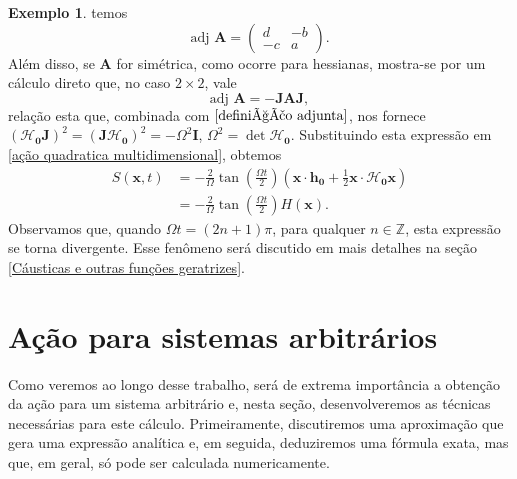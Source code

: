 \documentclass[
	12pt,
	oneside,			%
	a4paper,			%
	english,			%
	brazil				%
	]{abntex2}
\theoremstyle{definition}
\newtheorem{exmp}{Exemplo}[chapter]
\begin{document}
\begin{exmp}
    temos
    \begin{equation}
        \text{adj } \mathbf{A} = \begin{pmatrix}
        d & -b \\
        -c & a
        \end{pmatrix}.
    \end{equation}
    Além disso, se $\mathbf{A}$ for simétrica, como ocorre para hessianas, mostra-se por um cálculo direto que, no caso $2 \times 2$, vale
    \begin{equation}
        \text{adj } \mathbf{A} = -\mathbf{J} \mathbf{A} \mathbf{J},
    \end{equation}
    relação esta que, combinada com $\eqref{definição adjunta}$, nos fornece $\left(\boldsymbol{\mathcal{H}}_\mathbf{0} \mathbf{J}\right)^2 = \left(\mathbf{J}\boldsymbol{\mathcal{H}}_\mathbf{0} \right)^2 = -\Omega^2 \mathbf{I}$, $\Omega^2 = \det \boldsymbol{\mathcal{H}}_\mathbf{0}$. Substituindo esta expressão em \eqref{ação quadratica multidimensional}, obtemos
    \begin{equation}
    \label{ação_quadŕatica}
        \begin{aligned}
            S(\mathbf{x},t) &= -\frac{2}{\Omega}\tan \left(\frac{\Omega t}{2}\right) \left(  \mathbf{x} \cdot \mathbf{h_0} +  \frac{1}{2}\mathbf{x} \cdot \boldsymbol{\mathcal{H}_{\mathbf{0}}} \mathbf{x}\right) \\
            &= -\frac{2}{\Omega}\tan \left(\frac{\Omega t}{2}\right) H(\mathbf{x}).
        \end{aligned}
    \end{equation}
    Observamos que, quando $\Omega t = (2n+1) \pi$, para qualquer $n \in \mathbb{Z}$, esta expressão se torna divergente. Esse fenômeno será discutido em mais detalhes na seção \ref{Cáusticas e outras funções geratrizes}.
\end{exmp}

\section{Ação para sistemas arbitrários}
\label{composição funções geratrizes}

Como veremos ao longo desse trabalho, será de extrema importância a obtenção da ação para um sistema arbitrário e, nesta seção, desenvolveremos as técnicas necessárias para este cálculo. Primeiramente, discutiremos uma aproximação que gera uma expressão analítica e, em seguida, deduziremos uma fórmula exata, mas que, em geral, só pode ser calculada numericamente.
\end{document}
